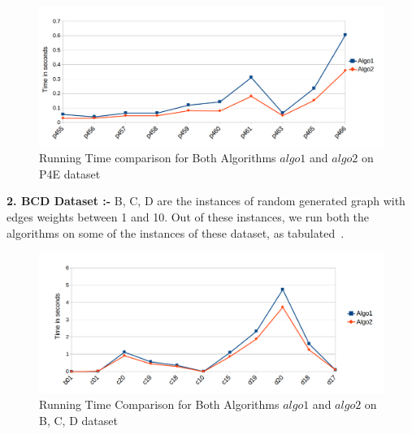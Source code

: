  \begin{figure}
      \centering
    \includegraphics[scale = 0.45]{es3.png}
  \caption{Running Time comparison for Both Algorithms $algo1$ and $algo2$ on P4E dataset}
\end{figure}

\textbf{2. BCD Dataset :-} B, C, D are the instances of random generated graph with edges weights between 1 and 10. Out of these instances, we run both the algorithms on some of the instances of these dataset, as tabulated~\cite{koch}.\\ 


 \begin{figure}[H]
      \centering
    \includegraphics[scale = 0.45]{es2.png}
  \caption{Running Time Comparison for Both Algorithms $algo1$ and $algo2$ on B, C, D dataset}
\end{figure}


